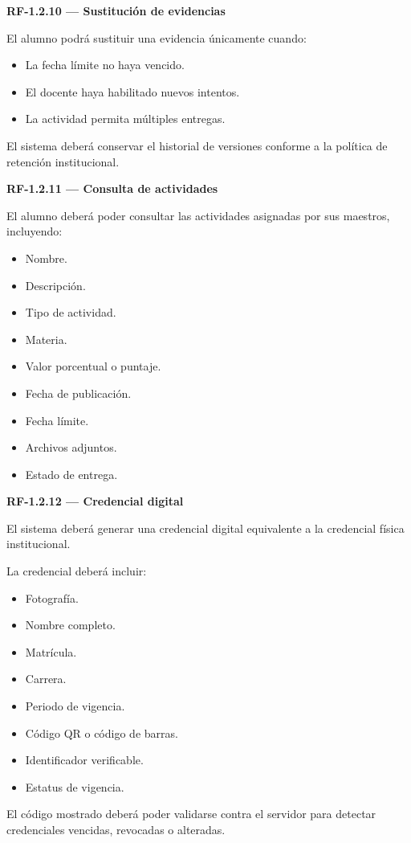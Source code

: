 \documentclass[12pt,a4paper]{article}
\newcommand{\RF}[1]{\textbf{\color{primary}RF-#1}}
\newenvironment{requisito}[1]
{
\begin{center}
\begin{minipage}{0.96\textwidth}
\colorbox{requirement}{
\begin{minipage}{0.94\textwidth}
\textbf{#1}
\end{minipage}
}
\vspace{2mm}
}
{
\end{minipage}
\end{center}
}
\begin{document}
\begin{requisito}{\RF{1.2.10} --- Sustitución de evidencias}
El alumno podrá sustituir una evidencia únicamente cuando:

\begin{itemize}[leftmargin=*]
\item La fecha límite no haya vencido.
\item El docente haya habilitado nuevos intentos.
\item La actividad permita múltiples entregas.
\end{itemize}

El sistema deberá conservar el historial de versiones conforme a la política de
retención institucional.
\end{requisito}

\begin{requisito}{\RF{1.2.11} --- Consulta de actividades}
El alumno deberá poder consultar las actividades asignadas por sus maestros,
incluyendo:

\begin{itemize}[leftmargin=*]
\item Nombre.
\item Descripción.
\item Tipo de actividad.
\item Materia.
\item Valor porcentual o puntaje.
\item Fecha de publicación.
\item Fecha límite.
\item Archivos adjuntos.
\item Estado de entrega.
\end{itemize}
\end{requisito}

\begin{requisito}{\RF{1.2.12} --- Credencial digital}
El sistema deberá generar una credencial digital equivalente a la credencial
física institucional.

La credencial deberá incluir:

\begin{itemize}[leftmargin=*]
\item Fotografía.
\item Nombre completo.
\item Matrícula.
\item Carrera.
\item Periodo de vigencia.
\item Código QR o código de barras.
\item Identificador verificable.
\item Estatus de vigencia.
\end{itemize}

El código mostrado deberá poder validarse contra el servidor para detectar
credenciales vencidas, revocadas o alteradas.
\end{requisito}
\end{document}
